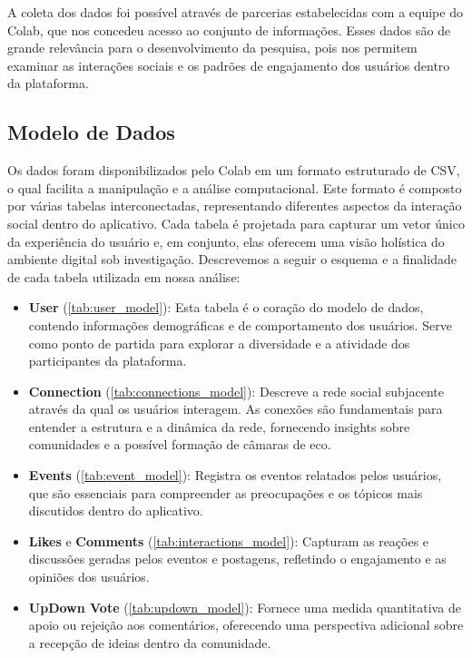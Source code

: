 A coleta dos dados foi possível através de parcerias estabelecidas com a equipe do Colab, que nos concedeu acesso ao conjunto de informações. Esses dados são de grande relevância para o desenvolvimento da pesquisa, pois nos permitem examinar as interações sociais e os padrões de engajamento dos usuários dentro da plataforma.

\subsection*{Modelo de Dados}
\label{sec:modelo_de_dados}

Os dados foram disponibilizados pelo Colab em um formato estruturado de CSV, o qual facilita a manipulação e a análise computacional. Este formato é composto por várias tabelas interconectadas, representando diferentes aspectos da interação social dentro do aplicativo. Cada tabela é projetada para capturar um vetor único da experiência do usuário e, em conjunto, elas oferecem uma visão holística do ambiente digital sob investigação. Descrevemos a seguir o esquema e a finalidade de cada tabela utilizada em nossa análise:

\begin{itemize}
    \item \textbf{User} (\autoref{tab:user_model}): Esta tabela é o coração do modelo de dados, contendo informações demográficas e de comportamento dos usuários. Serve como ponto de partida para explorar a diversidade e a atividade dos participantes da plataforma.
    
    \item \textbf{Connection} (\autoref{tab:connections_model}): Descreve a rede social subjacente através da qual os usuários interagem. As conexões são fundamentais para entender a estrutura e a dinâmica da rede, fornecendo insights sobre comunidades e a possível formação de câmaras de eco.
    
    \item \textbf{Events} (\autoref{tab:event_model}): Registra os eventos relatados pelos usuários, que são essenciais para compreender as preocupações e os tópicos mais discutidos dentro do aplicativo.
    
    \item \textbf{Likes} e \textbf{Comments} (\autoref{tab:interactions_model}): Capturam as reações e discussões geradas pelos eventos e postagens, refletindo o engajamento e as opiniões dos usuários.
    
    \item \textbf{UpDown Vote} (\autoref{tab:updown_model}): Fornece uma medida quantitativa de apoio ou rejeição aos comentários, oferecendo uma perspectiva adicional sobre a recepção de ideias dentro da comunidade.
\end{itemize}

